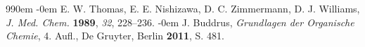 \documentclass[12pt]{article}
\begin{document}
\begin{onehalfspace}
\renewcommand{\section}[2]{}%
\def\bibindent{0em}
\begin{thebibliography}{99\kern\bibindent}
\makeatletter
\let\old@biblabel\@biblabel
\def\@biblabel#1{\old@biblabel{#1}\kern\bibindent}
\let\old@bibitem\bibitem
\def\bibitem#1{\old@bibitem{#1}\leavevmode\kern-\bibindent}
\makeatother
{}
E. W. Thomas, E. E. Nishizawa, D. C. Zimmermann, D. J. Williams, \textit{
J. Med. Chem.} \textbf{1989}, \textit{32}, 228–236.
J. Buddrus, \textit{Grundlagen der Organische Chemie}, 4. Aufl., De Gruyter, Berlin \textbf{2011}, S. 481.
\end{thebibliography}
\end{onehalfspace}
\end{document}
